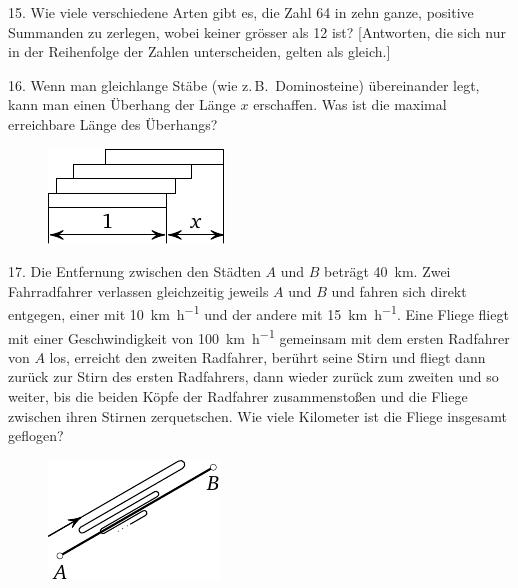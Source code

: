 \begin{problem}{15.}
	Wie viele verschiedene Arten gibt es, die Zahl 64 in zehn ganze, positive Summanden zu zerlegen, wobei keiner grösser als 12 ist?
	[Antworten, die sich nur in der Reihenfolge der Zahlen unterscheiden, gelten als gleich.]
\end{problem}

\begin{problem}{16.}
	Wenn man gleichlange Stäbe (wie z.\,B.\ Dominosteine) übereinander legt, kann man einen Überhang der Länge $x$ erschaffen. Was ist die maximal er\-reich\-ba\-re Länge des Überhangs? 
	\begin{figure}
		\includegraphics{taskbook-97}
	\end{figure}
\end{problem}

\begin{problem}{17.}
	Die Entfernung zwischen den Städten $A$ und $B$ beträgt \SI{40}{\km}. Zwei Fahrradfahrer verlassen gleich\-zei\-tig jeweils $A$ und $B$ und fahren sich direkt entgegen, einer mit \SI{10}{\km\per\hour} und der andere mit \SI{15}{\km\per\hour}. Eine Fliege fliegt mit einer Geschwindigkeit von \SI{100}{\km\per\hour} gemeinsam mit dem ersten Radfahrer von $A$ los, er\-reicht den zweiten Radfahrer, berührt seine Stirn und fliegt dann zurück zur Stirn des ersten Radfahrers, dann wieder zurück zum zweiten und so weiter, bis die beiden Köpfe der Radfahrer zusammenstoßen und die Fliege zwischen ihren Stirnen zerquetschen. 
	Wie viele Kilometer ist die Fliege insgesamt geflogen? 
	\begin{figure}
		\includegraphics{taskbook-1}
	\end{figure}
\end{problem}

